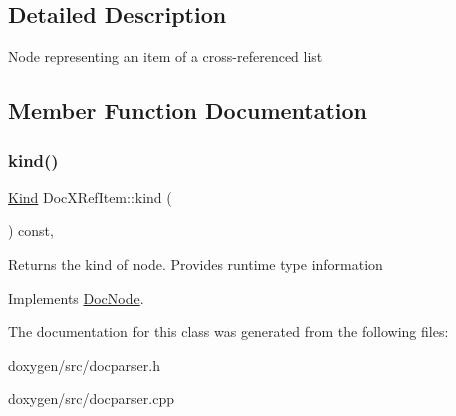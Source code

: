 \subsection{Detailed Description}
Node representing an item of a cross-\/referenced list 

\subsection{Member Function Documentation}
\mbox{\label{class_doc_x_ref_item_a8659267ac3981eedcbb39be9ab3c9c92}} 
\subsubsection{\texorpdfstring{kind()}{kind()}}
{\footnotesize\ttfamily \mbox{\hyperlink{class_doc_node_aebd16e89ca590d84cbd40543ea5faadb}{Kind}} Doc\+X\+Ref\+Item\+::kind (\begin{DoxyParamCaption}{ }\end{DoxyParamCaption}) const\hspace{0.3cm}{\ttfamily [inline]}, {\ttfamily [virtual]}}

Returns the kind of node. Provides runtime type information 

Implements \mbox{\hyperlink{class_doc_node_a108ffd214a72ba6e93dac084a8f58049}{Doc\+Node}}.



The documentation for this class was generated from the following files\+:\begin{DoxyCompactItemize}
\item 
doxygen/src/docparser.\+h\item 
doxygen/src/docparser.\+cpp\end{DoxyCompactItemize}
